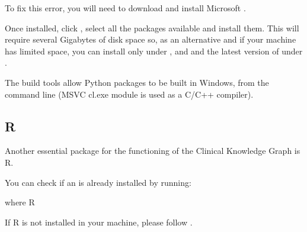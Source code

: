 \documentclass[letterpaper,10pt,english]{sphinxmanual}
\begin{document}
\begin{sphinxVerbatim}[commandchars=\\\{\}]
      
\end{sphinxVerbatim}

To fix this error, you will need to download and install Microsoft .

Once installed, click , select all the packages available and install them. This will require several Gigabytes of disk space so, as an alternative and if your machine has limited space, you can install only  under , and  and the latest version of  under .

The build tools allow Python packages to be built in Windows, from the command line (MSVC cl.exe module is used as a C/C++ compiler).


\subsection{R}
\label{\detokenize{intro/getting-started-with-windows:r}}
Another essential package for the functioning of the Clinical Knowledge Graph is R.

You can check if an  is already installed by running:

\begin{sphinxVerbatim}[commandchars=\\\{\}]
\PYGZgt{} where R
\end{sphinxVerbatim}

If R is not installed in your machine, please follow .
\end{document}
